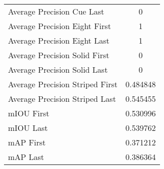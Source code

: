 \begin{figure}
\begin{subfigure}[b]{0.49\textwidth}
\begin{tabular}{|l|c|}
        Average Precision Cue Last & 0 \\
        Average Precision Eight First & 1 \\
        Average Precision Eight Last & 1 \\
        Average Precision Solid First & 0 \\
        Average Precision Solid Last & 0 \\
        Average Precision Striped First & 0.484848 \\
        Average Precision Striped Last & 0.545455 \\
        \hline
        mIOU First & 0.530996 \\
        mIOU Last & 0.539762 \\
        mAP First & 0.371212 \\
        mAP Last & 0.386364 \\
        \hline
    \end{tabular}    
\end{subfigure}
\end{figure}

